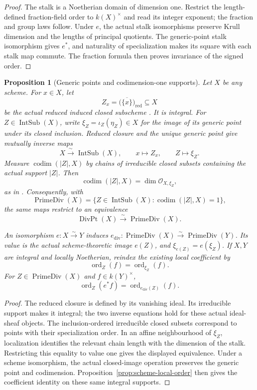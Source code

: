 \documentclass[11pt]{article}
\newtheorem{proposition}[theorem]{Proposition}
\theoremstyle{definition}
\theoremstyle{remark}
\begin{document}
\begin{proof}
The stalk is a Noetherian domain of dimension one. Restrict the
length-defined fraction-field order to \(k(X)^\times\) and read its integer
exponent; the fraction and group laws follow. Under \(e\), the actual
stalk isomorphisms preserve Krull dimension and the lengths of principal
quotients. The generic-point stalk isomorphism gives \(e^*\), and
naturality of specialization makes its square with each stalk map
commute. The fraction formula then proves invariance of the signed order.
\end{proof}

\begin{proposition}[Generic points and codimension-one supports]
\label{prop:divisor-support}
Let \(X\) be any scheme. For \(x\in X\), let
\[
  Z_x=\bigl(\overline{\{x\}}\bigr)_{\mathrm{red}}\subseteq X
\]
be the actual reduced induced closed subscheme
\cite{StacksReducedClosedSubscheme}. It is integral. For
\(Z\in\operatorname{IntSub}(X)\), write
\(\xi_Z=\iota_Z(\eta_Z)\in X\) for the image of its generic point
under its closed inclusion. Reduced closure and the unique generic point
\cite{StacksGenericPoint} give mutually inverse maps
\[
  X\xrightarrow{\ \sim\ }\operatorname{IntSub}(X),
  \qquad x\longmapsto Z_x,\qquad Z\longmapsto\xi_Z.
\]
Measure \(\operatorname{codim}(|Z|,X)\) by chains of irreducible closed
subsets containing the actual support \(|Z|\). Then
\[
  \operatorname{codim}(|Z|,X)=\dim\mathcal O_{X,\xi_Z},
\]
as in \cite{StacksCodimensionStalkDimension}. Consequently, with
\[
  \operatorname{PrimeDiv}(X)
    =\{Z\in\operatorname{IntSub}(X):\operatorname{codim}(|Z|,X)=1\},
\]
the same maps restrict to an equivalence
\[
  \operatorname{DivPt}(X)\xrightarrow{\ \sim\ }\operatorname{PrimeDiv}(X).
\]

An isomorphism \(e:X\xrightarrow{\sim}Y\) induces
\(e_{\mathrm{div}}:\operatorname{PrimeDiv}(X)\xrightarrow{\sim}
\operatorname{PrimeDiv}(Y)\). Its value is the actual scheme-theoretic
image \(e(Z)\), and \(\xi_{e(Z)}=e(\xi_Z)\).
If \(X,Y\) are integral and locally Noetherian, reindex the existing
local coefficient by
\[
  \operatorname{ord}_Z(f)=\operatorname{ord}_{\xi_Z}(f).
\]
For \(Z\in\operatorname{PrimeDiv}(X)\) and \(f\in k(Y)^\times\),
\[
  \operatorname{ord}_Z(e^*f)
    =\operatorname{ord}_{e_{\mathrm{div}}(Z)}(f).
\]
\end{proposition}

\begin{proof}
The reduced closure is defined by its vanishing ideal. Its irreducible
support makes it integral; the two inverse equations hold for these
actual ideal-sheaf objects. The inclusion-ordered irreducible closed
subsets correspond to points with their specialization order. In an
affine neighbourhood of \(\xi_Z\), localization identifies the relevant
chain length with the dimension of the stalk. Restricting this equality
to value one gives the displayed equivalence. Under a scheme isomorphism,
the actual closed-image operation preserves the generic point and
codimension. Proposition~\ref{prop:scheme-local-order} then gives the
coefficient identity on these same integral supports.
\end{proof}
\end{document}
